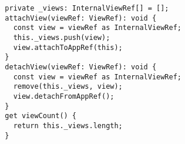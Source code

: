 \begin{verbatim}
  private _views: InternalViewRef[] = [];
  attachView(viewRef: ViewRef): void {
    const view = viewRef as InternalViewRef;
    this._views.push(view);
    view.attachToAppRef(this);
  }
  detachView(viewRef: ViewRef): void {
    const view = viewRef as InternalViewRef;
    remove(this._views, view);
    view.detachFromAppRef();
  }
  get viewCount() {
    return this._views.length;
  }
\end{verbatim}
